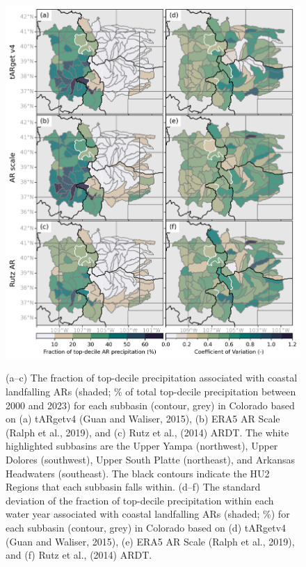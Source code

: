 \documentclass[draft]{agujournal2019}
\begin{document}
\begin{figure}
\noindent\includegraphics[width=\textwidth]{fig3.png}
\label{fig:choropleth}
\caption{(a–c) The fraction of top-decile precipitation associated with coastal landfalling ARs (shaded; \% of total top-decile precipitation between 2000 and 2023) for each subbasin (contour, grey) in Colorado based on (a) tARgetv4 (Guan and Waliser, 2015), (b) ERA5 AR Scale (Ralph et al., 2019), and (c) Rutz et al., (2014) ARDT. The white highlighted subbasins are the Upper Yampa (northwest), Upper Dolores (southwest), Upper South Platte (northeast), and Arkansas Headwaters (southeast). The black contours indicate the HU2 Regions that each subbasin falls within. (d–f) The standard deviation of the fraction of top-decile precipitation within each water year associated with coastal landfalling ARs (shaded; \%) for each subbasin (contour, grey) in Colorado based on (d)  tARgetv4 (Guan and Waliser, 2015), (e) ERA5 AR Scale (Ralph et al., 2019), and (f) Rutz et al., (2014) ARDT. }
\end{figure}

%
%
%
\end{document}
